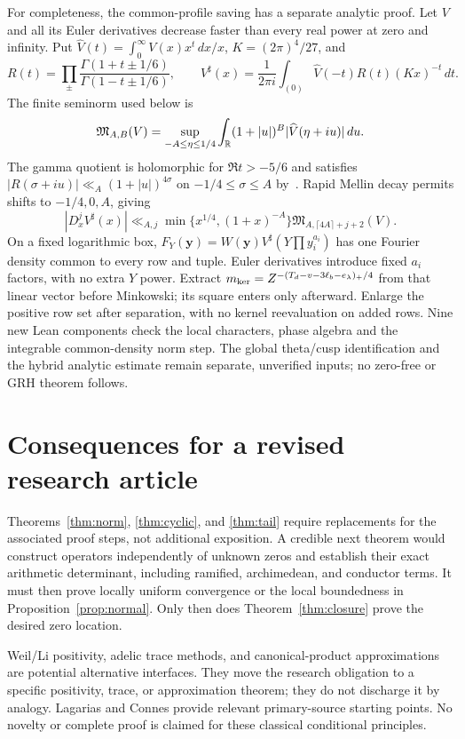 For completeness, the common-profile saving has a separate analytic proof.
Let $V$ and all its Euler derivatives decrease faster than every real
power at zero and infinity. Put $\widehat V(t)=\int_0^\infty V(x)x^t\,dx/x$,
$K=(2\pi)^4/27$, and
\[
 R(t)=\prod_\pm\frac{\Gamma(1+t\pm1/6)}{\Gamma(1-t\pm1/6)},\qquad
 V^\sharp(x)=\frac1{2\pi i}\int_{(0)}\widehat V(-t)R(t)(Kx)^{-t}\,dt.
\]
The finite seminorm used below is
\[
 \mathfrak M_{A,B}(V)=\sup_{-A\le\eta\le1/4}
       \int_\mathbb R(1+|u|)^B|\widehat V(\eta+iu)|\,du.
\]
The gamma quotient is holomorphic for $\Re t>-5/6$ and satisfies
$|R(\sigma+iu)|\ll_A(1+|u|)^{4\sigma}$ on
$-1/4\le\sigma\le A$ by~\cite{dlmfgamma}.
Rapid Mellin decay permits shifts to $-1/4,0,A$, giving
\[
 |D_x^jV^\sharp(x)|\ll_{A,j}
 \min\{x^{1/4},(1+x)^{-A}\}
 \mathfrak M_{A,\lceil4A\rceil+j+2}(V).
\]
On a fixed logarithmic box,
$F_Y(\boldsymbol y)=W(\boldsymbol y)V^\sharp(Y\prod y_i^{a_i})$
has one Fourier density common to every row and tuple. Euler derivatives
introduce fixed $a_i$ factors, with no extra $Y$ power.
Extract $m_{\rm ker}=Z^{-(T_d-v-3\ell_b-e_\lambda)_+/4}$ from
that linear vector before Minkowski; its square enters only afterward.
Enlarge the positive row set after separation, with no kernel reevaluation
on added rows. Nine new Lean components check the local characters,
phase algebra and the integrable common-density norm step.
The global theta/cusp identification and the hybrid analytic estimate
remain separate, unverified inputs; no zero-free or GRH theorem follows.

\section{Consequences for a revised research article}
Theorems~\ref{thm:norm}, \ref{thm:cyclic}, and \ref{thm:tail}
require replacements for the associated proof steps, not additional exposition.
A credible next theorem would construct operators independently of unknown
zeros and establish their exact arithmetic determinant, including ramified,
archimedean, and conductor terms. It must then prove locally uniform
convergence or the local boundedness in Proposition~\ref{prop:normal}.
Only then does Theorem~\ref{thm:closure} prove the desired zero location.

Weil/Li positivity, adelic trace methods, and canonical-product approximations
are potential alternative interfaces. They move the research obligation to a
specific positivity, trace, or approximation theorem; they do not discharge it
by analogy. Lagarias \cite{lagarias} and Connes \cite{connes} provide relevant
primary-source starting points. No novelty or complete proof is claimed for
these classical conditional principles.



